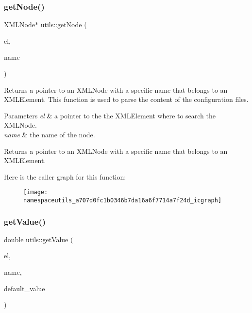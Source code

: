 \subsubsection{\texorpdfstring{get\+Node()}{getNode()}}
{\footnotesize\ttfamily X\+M\+L\+Node$\ast$ utils\+::get\+Node (\begin{DoxyParamCaption}\item[{X\+M\+L\+Element $\ast$}]{el,  }\item[{const char $\ast$}]{name }\end{DoxyParamCaption})}

Returns a pointer to an X\+M\+L\+Node with a specific name that belongs to an X\+M\+L\+Element. This function is used to parse the content of the configuration files. 
\begin{DoxyParams}{Parameters}
{\em el} & a pointer to the the X\+M\+L\+Element where to search the X\+M\+L\+Node. \\
\hline
{\em name} & the name of the node. \\
\hline
\end{DoxyParams}
\begin{DoxyReturn}{Returns}
a pointer to an X\+M\+L\+Node with a specific name that belongs to an X\+M\+L\+Element. 
\end{DoxyReturn}
Here is the caller graph for this function\+:
\nopagebreak
\begin{figure}[H]
\begin{center}
\leavevmode
\texttt{[image: namespaceutils\_a707d0fc1b0346b7da16a6f7714a7f24d\_icgraph]}
\end{center}
\end{figure}
\mbox{\label{namespaceutils_a90cdccb9260004c67a61003d648b4e14}} 
\subsubsection{\texorpdfstring{get\+Value()}{getValue()}\hspace{0.1cm}{\footnotesize\ttfamily [1/5]}}
{\footnotesize\ttfamily double utils\+::get\+Value (\begin{DoxyParamCaption}\item[{X\+M\+L\+Element $\ast$}]{el,  }\item[{const char $\ast$}]{name,  }\item[{double}]{default\+\_\+value }\end{DoxyParamCaption})}

